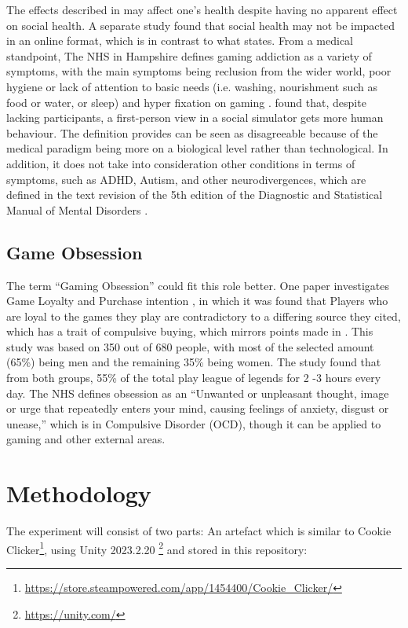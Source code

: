 \documentclass[conference]{IEEEtran}
\begin{document}
The effects described in \cite{Rahman2021} may affect one’s health despite having no apparent effect on social health. A separate study \cite{Schlagowski2024} found that social health may not be impacted in an online format, which is in contrast to what \cite{NHSHamp24} states. From a medical standpoint, The NHS in Hampshire defines gaming addiction as a variety of symptoms, with the main symptoms being reclusion from the wider world, poor hygiene or lack of attention to basic needs (i.e. washing, nourishment such as food or water, or sleep) and hyper fixation on gaming \cite{NHSHamp24}. \cite{Schlagowski2024} found that, despite lacking participants, a first-person view in a social simulator gets more human behaviour. The definition \cite{NHSHamp24} provides can be seen as disagreeable because of the medical paradigm being more on a biological level rather than technological. In addition, it does not take into consideration other conditions in terms of symptoms, such as ADHD, Autism, and other neurodivergences, which are defined in the text revision of the 5th edition of the Diagnostic and Statistical Manual of Mental Disorders \cite{Association2022}.\\

\subsection{Game Obsession}
The term “Gaming Obsession” could fit this role better. One paper investigates Game Loyalty and Purchase intention \cite{Ramli2022}, in which it was found that Players who are loyal to the games they play are contradictory to a differing source they cited\cite{Widodo2020}, which has a trait of compulsive buying, which mirrors points made in \cite{yasir2021}. This study was based on 350 out of 680 people, with most of the selected amount (65\%) being men and the remaining 35\% being women. The study found that from both groups, 55\% of the total play league of legends \cite{Games2009} for 2 -3 hours every day. The NHS \cite{NHS2021} defines obsession as an “Unwanted or unpleasant thought, image or urge that repeatedly enters your mind, causing feelings of anxiety, disgust or unease,” which is in Compulsive Disorder (OCD), though it can be applied to gaming and other external areas.\\

\section{Methodology}
 The experiment will consist of two parts: An artefact which is similar to Cookie Clicker\footnote{\url{https://store.steampowered.com/app/1454400/Cookie_Clicker/}}, using Unity 2023.2.20  \footnote{\url{https://unity.com/}} and stored in this repository:\\
\end{document}

